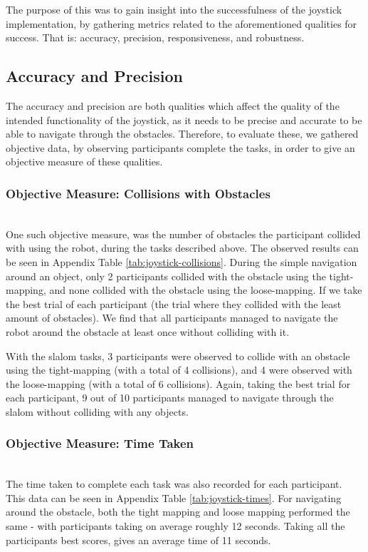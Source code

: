 \documentclass{l4proj}
\begin{document}
The purpose of this was to gain insight into the successfulness of the joystick implementation, by gathering metrics related to the aforementioned qualities for success. That is: accuracy, precision, responsiveness, and robustness.

\subsection{Accuracy and Precision}
The accuracy and precision are both qualities which affect the quality of the intended functionality of the joystick, as it needs to be precise and accurate to be able to navigate through the obstacles. Therefore, to evaluate these, we gathered objective data, by observing participants complete the tasks, in order to give an objective measure of these qualities.

\subsubsection{Objective Measure: Collisions with Obstacles} \hfill \\
One such objective measure, was the number of obstacles the participant collided with using the robot, during the tasks described above. The observed results can be seen in Appendix Table \ref{tab:joystick-collisions}. During the simple navigation around an object, only 2 participants collided with the obstacle using the tight-mapping, and none collided with the obstacle using the loose-mapping. If we take the best trial of each participant (the trial where they collided with the least amount of obstacles). We find that all participants managed to navigate the robot around the obstacle at least once without colliding with it.

With the slalom tasks, 3 participants were observed to collide with an obstacle using the tight-mapping (with a total of 4 collisions), and 4 were observed with the loose-mapping (with a total of 6 collisions). Again, taking the best trial for each participant, 9 out of 10 participants managed to navigate through the slalom without colliding with any objects.

\subsubsection{Objective Measure: Time Taken} \hfill \\
The time taken to complete each task was also recorded for each participant. This data can be seen in Appendix Table \ref{tab:joystick-times}. For navigating around the obstacle, both the tight mapping and loose mapping performed the same - with participants taking on average roughly 12 seconds. Taking all the participants best scores, gives an average time of 11 seconds.
\end{document}
